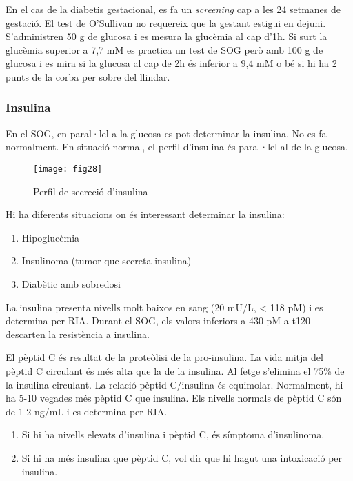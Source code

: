 En el cas de la diabetis gestacional, es fa un \textit{screening} cap
a les 24 setmanes de gestació. El test de O'Sullivan no requereix que
la gestant estigui en dejuni. S'administren 50 g de glucosa i es
mesura la glucèmia al cap d'1h. Si surt la glucèmia superior a 7,7 mM
es practica un test de SOG però amb 100 g de glucosa i es mira si la
glucosa al cap de 2h és inferior a 9,4 mM o bé si hi ha 2 punts de la
corba per sobre del llindar.

\subsubsection{Insulina}
\label{sec:insulina}
En el SOG, en paral·lel a la glucosa es pot determinar la insulina. No
es fa normalment. En situació normal, el perfil d'insulina és
paral·lel al de la glucosa. 

\begin{figure}[H]
  \centering
  \texttt{[image: fig28]}
  \caption{Perfil de secreció d'insulina}
  \label{fig:fig28}
\end{figure}

Hi ha diferents situacions on és interessant determinar la insulina:
\begin{enumerate}
\item Hipoglucèmia
\item Insulinoma (tumor que secreta insulina)
\item Diabètic amb sobredosi
\end{enumerate}

La insulina presenta nivells molt baixos en sang (20 mU/L, < 118 pM) i
es determina per RIA. Durant el SOG, els valors inferiors a 430 pM a
t120 descarten la resistència a insulina.

El pèptid C és resultat de la proteòlisi de la pro-insulina. La vida
mitja del pèptid C circulant és més alta que la de la insulina. Al
fetge s'elimina el 75\% de la insulina circulant. La relació pèptid
C/insulina és equimolar. Normalment, hi ha 5-10 vegades més pèptid C
que insulina. Els nivells normals de pèptid C són de 1-2 ng/mL i es
determina per RIA.
\begin{enumerate}
\item Si hi ha nivells elevats d'insulina i pèptid C, és símptoma
  d'insulinoma.
\item Si hi ha més insulina que pèptid C, vol dir que hi hagut una
  intoxicació per insulina.
\end{enumerate}

